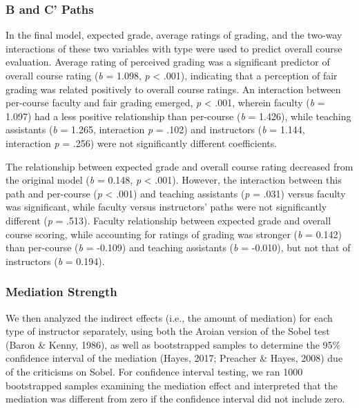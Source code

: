 \documentclass[,man,mask]{apa6}
\begin{document}
\hypertarget{b-and-c-paths}{%
\subsubsection{B and C' Paths}\label{b-and-c-paths}}

In the final model, expected grade, average ratings of grading, and the two-way interactions of these two variables with type were used to predict overall course evaluation. Average rating of perceived grading was a significant predictor of overall course rating (\emph{b} = 1.098, \emph{p} \textless{} .001), indicating that a perception of fair grading was related positively to overall course ratings. An interaction between per-course faculty and fair grading emerged, \emph{p} \textless{} .001, wherein faculty (\emph{b} = 1.097) had a less positive relationship than per-course (\emph{b} = 1.426), while teaching assistants (\emph{b} = 1.265, interaction \emph{p} = .102) and instructors (\emph{b} = 1.144, interaction \emph{p} = .256) were not significantly different coefficients.

The relationship between expected grade and overall course rating decreased from the original model (\emph{b} = 0.148, \emph{p} \textless{} .001). However, the interaction between this path and per-course (\emph{p} \textless{} .001) and teaching assistants (\emph{p} = .031) versus faculty was significant, while faculty versus instructors' paths were not significantly different (\emph{p} = .513). Faculty relationship between expected grade and overall course scoring, while accounting for ratings of grading was stronger (\emph{b} = 0.142) than per-course (\emph{b} = -0.109) and teaching assistants (\emph{b} = -0.010), but not that of instructors (\emph{b} = 0.194).

\hypertarget{mediation-strength}{%
\subsubsection{Mediation Strength}\label{mediation-strength}}

We then analyzed the indirect effects (i.e., the amount of mediation) for each type of instructor separately, using both the Aroian version of the Sobel test (Baron \& Kenny, 1986), as well as bootstrapped samples to determine the 95\% confidence interval of the mediation (Hayes, 2017; Preacher \& Hayes, 2008) due of the criticisms on Sobel. For confidence interval testing, we ran 1000 bootstrapped samples examining the mediation effect and interpreted that the mediation was different from zero if the confidence interval did not include zero.
\end{document}
